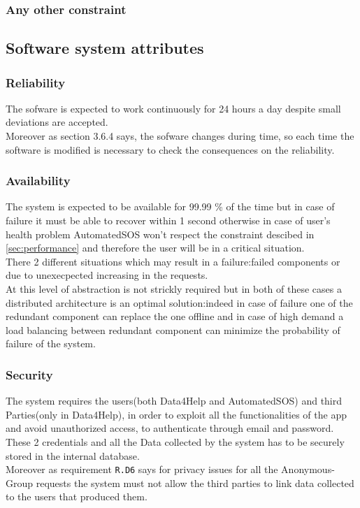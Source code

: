     \subsubsection{Any other constraint}
  \subsection{Software system attributes}

    \subsubsection{Reliability}

      The sofware is expected to work continuously for 24 hours a day despite small deviations are accepted. \\
      Moreover as section 3.6.4 says, the sofware changes during time, so each time the software is modified is necessary to check the consequences on the reliability.

    \subsubsection{Availability}

      The system is expected to be available for 99.99 \% of the time but in case of failure it must be able to recover within 1 second otherwise in case of user's health problem AutomatedSOS won't respect the constraint descibed in \ref{sec:performance} and therefore the user will be in a critical situation.\\ There 2 different situations which may result in a failure:failed components or due to unexecpected increasing in the requests. \\At this level of abstraction is not strickly required but in both of these cases a distributed architecture is an optimal solution:indeed in case of failure one of the redundant component can replace the one offline and in case of high demand a load balancing between redundant component can minimize the probability of failure of the system.

    \subsubsection{Security}

      The system requires the users(both Data4Help and AutomatedSOS) and third Parties(only in Data4Help), in order to exploit all the functionalities of the app and avoid unauthorized access, to authenticate through email and password.\\ These 2 credentials and all the Data collected by the system has to be securely stored in the internal database.\\ Moreover as  requirement \texttt{R.D6} says for privacy issues for all the Anonymous-Group requests the system must not allow the third parties to link data collected to the users that produced them.

